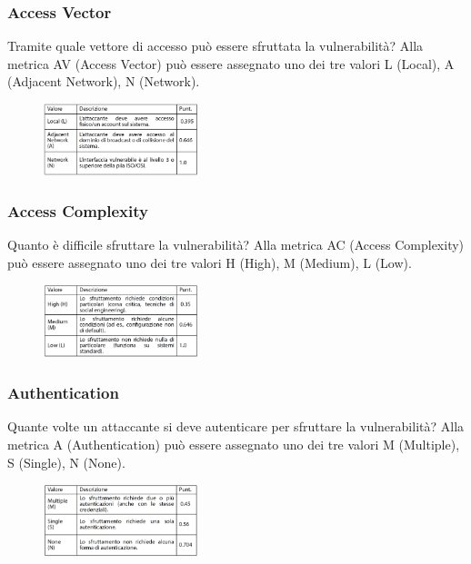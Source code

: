 \subsubsection{Access Vector}
Tramite quale vettore di accesso può essere
sfruttata la vulnerabilità? Alla metrica AV (Access Vector) può essere assegnato uno
dei tre valori L (Local), A (Adjacent Network), N (Network).

\begin{figure}[hbpt!]
    \centering
    \includegraphics[width=0.4\textwidth]{./Images/cap2/2.8.png}
\end{figure}
\FloatBarrier

\subsubsection{Access Complexity}
Quanto è difficile sfruttare la vulnerabilità? Alla metrica AC (Access Complexity) può essere assegnato uno
dei tre valori H (High), M (Medium), L (Low). 

\begin{figure}[hbpt!]
    \centering
    \includegraphics[width=0.4\textwidth]{./Images/cap2/2.9.png}
\end{figure}
\FloatBarrier

\subsubsection{Authentication}
Quante volte un attaccante si deve
autenticare per sfruttare la vulnerabilità? Alla metrica A (Authentication) può essere assegnato uno
dei tre valori M (Multiple), S (Single), N (None).

\begin{figure}[hbpt!]
    \centering
    \includegraphics[width=0.4\textwidth]{./Images/cap2/2.10.png}
\end{figure}
\FloatBarrier


